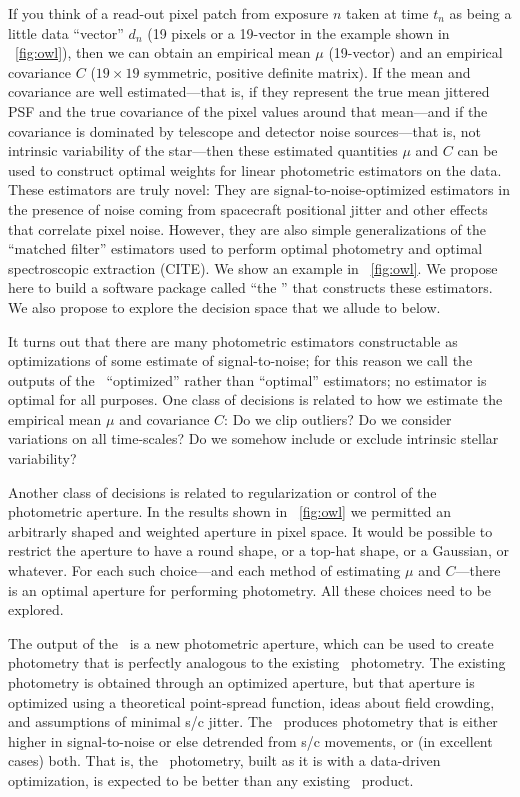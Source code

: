 \documentclass[letterpaper,12pt,preprint]{hack_aastex}
\begin{document}
If you think of a read-out pixel patch from exposure $n$ taken at time
$t_n$ as being a little data ``vector'' $d_n$ (19 pixels or a 19-vector
in the example shown in \figurename~\ref{fig:owl}), then we can obtain an
empirical mean $\mu$ (19-vector) and an empirical covariance $C$ ($19\times 19$
symmetric, positive definite matrix).
If the mean and covariance are well estimated---that is, if they
represent the true mean jittered PSF and the true covariance of the
pixel values around that mean---and if the covariance is dominated by
telescope and detector noise sources---that is, not intrinsic
variability of the star---then these estimated quantities $\mu$ and
$C$ can be used to construct optimal weights for linear photometric
estimators on the data.
These estimators are truly novel:
They are signal-to-noise-optimized estimators in the presence of noise coming
from spacecraft positional jitter and other effects that correlate pixel noise.
However, they are also simple generalizations of the ``matched filter''
estimators used to perform optimal photometry and optimal spectroscopic
extraction (CITE).
We show an example in \figurename~\ref{fig:owl}.
We propose here to build a software package called ``the \OWL'' that constructs
these estimators.
We also propose to explore the decision space that we allude to below.


It turns out that there are many photometric estimators constructable as
optimizations of some estimate of signal-to-noise; for this reason we call 
the outputs of the \OWL\ ``optimized'' rather than ``optimal'' estimators;
no estimator is optimal for all purposes.
One class of decisions is related to how we estimate the empirical mean $\mu$
and covariance $C$:
Do we clip outliers?
Do we consider variations on all time-scales?
Do we somehow include or exclude intrinsic stellar variability?

Another class of decisions is related to regularization or control of the
photometric aperture.
In the results shown in \figurename~\ref{fig:owl} we permitted an arbitrarly
shaped and weighted aperture in pixel space.
It would be possible to restrict the aperture to have a round shape, or a
top-hat shape, or a Gaussian, or whatever.
For each such choice---and each method of estimating $\mu$ and $C$---there is
an optimal aperture for performing photometry.
All these choices need to be explored.

The output of the \OWL\ is a new photometric aperture, which can be used to
create photometry that is perfectly analogous to the existing \Kepler\
photometry.
The existing photometry is obtained through an optimized aperture, but that
aperture is optimized using a theoretical point-spread function, ideas about
field crowding, and assumptions of minimal s/c jitter.
The \OWL\ produces photometry that is either higher in signal-to-noise or else
detrended from s/c movements, or (in excellent cases) both.
That is, the \OWL\ photometry, built as it is with a data-driven optimization,
is expected to be better than any existing \Kepler\ product.
\end{document}
